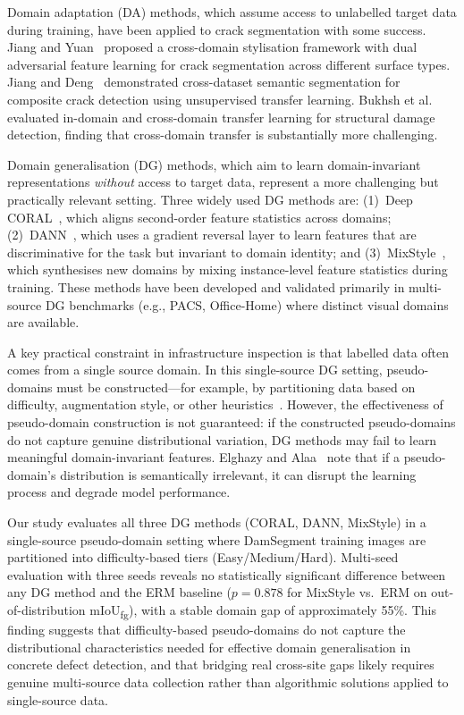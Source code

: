 Domain adaptation (DA) methods, which assume access to unlabelled target data during training, have been applied to crack segmentation with some success. Jiang and Yuan~\cite{jiang2025udacrack} proposed a cross-domain stylisation framework with dual adversarial feature learning for crack segmentation across different surface types. Jiang and Deng~\cite{jiang2025crossdataset} demonstrated cross-dataset semantic segmentation for composite crack detection using unsupervised transfer learning. Bukhsh et al.~\cite{bukhsh2021damage} evaluated in-domain and cross-domain transfer learning for structural damage detection, finding that cross-domain transfer is substantially more challenging.

Domain generalisation (DG) methods, which aim to learn domain-invariant representations \emph{without} access to target data, represent a more challenging but practically relevant setting. Three widely used DG methods are: (1)~Deep CORAL~\cite{sun2016coral}, which aligns second-order feature statistics across domains; (2)~DANN~\cite{ganin2016dann}, which uses a gradient reversal layer to learn features that are discriminative for the task but invariant to domain identity; and (3)~MixStyle~\cite{zhou2021mixstyle, zhou2023mixstyle}, which synthesises new domains by mixing instance-level feature statistics during training. These methods have been developed and validated primarily in multi-source DG benchmarks (e.g., PACS, Office-Home) where distinct visual domains are available.

A key practical constraint in infrastructure inspection is that labelled data often comes from a single source domain. In this single-source DG setting, pseudo-domains must be constructed---for example, by partitioning data based on difficulty, augmentation style, or other heuristics~\cite{elghazy2025pseudodg}. However, the effectiveness of pseudo-domain construction is not guaranteed: if the constructed pseudo-domains do not capture genuine distributional variation, DG methods may fail to learn meaningful domain-invariant features. Elghazy and Alaa~\cite{elghazy2025pseudodg} note that if a pseudo-domain's distribution is semantically irrelevant, it can disrupt the learning process and degrade model performance.

Our study evaluates all three DG methods (CORAL, DANN, MixStyle) in a single-source pseudo-domain setting where DamSegment training images are partitioned into difficulty-based tiers (Easy/Medium/Hard). Multi-seed evaluation with three seeds reveals no statistically significant difference between any DG method and the ERM baseline ($p=0.878$ for MixStyle vs.\ ERM on out-of-distribution mIoU\textsubscript{fg}), with a stable domain gap of approximately 55\%. This finding suggests that difficulty-based pseudo-domains do not capture the distributional characteristics needed for effective domain generalisation in concrete defect detection, and that bridging real cross-site gaps likely requires genuine multi-source data collection rather than algorithmic solutions applied to single-source data.

